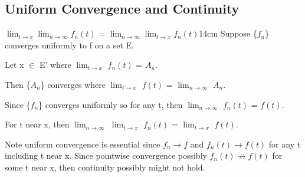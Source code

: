     \newpage





\subsection[ Continuity ]{ Uniform Convergence and Continuity }

    \begin{wtheorem}{$\lim_{t \rightarrow x} \lim_{n \rightarrow \infty} f_n(t)$
    = $\lim_{n \rightarrow \infty} \lim_{t \rightarrow x} f_n(t)$}{14cm}
        Suppose \{$f_n$\} converges uniformly to f on a set E.
        
        Let x $\in$ E' where $\lim_{t \rightarrow x}$ $f_n(t)$ = $A_n$.

        Then \{$A_n$\} converges where
        $\lim_{t \rightarrow x}$ $f(t)$ = $\lim_{n \rightarrow \infty}$ $A_n$.
    \end{wtheorem}

    \begin{intuition}
        Since \{$f_n$\} converges uniformly so for any t, then
        $\lim_{n \rightarrow \infty}$ $f_n(t)$ = $f(t)$.

        For t near x, then
        $\lim_{n \rightarrow \infty}$ $\lim_{t \rightarrow x}$ $f_n(t)$
        = $\lim_{t \rightarrow x}$ $f(t)$.

        \vspace{0.2cm}

        Note uniform convergence is essential since $f_n \rightarrow f$
        and $f_n(t) \rightarrow f(t)$ for any t including t near x.
        Since pointwise convergence possibly $f_n(t) \not \rightarrow f(t)$
        for some t near x,
        then continuity possibly might not hold.
    \end{intuition}

    \vspace{0.1cm}

